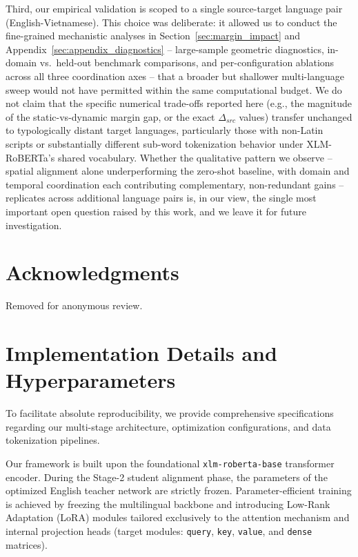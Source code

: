 \documentclass[11pt]{article}
\begin{document}
Third, our empirical validation is scoped to a single source-target language pair (English-Vietnamese). This choice was deliberate: it allowed us to conduct the fine-grained mechanistic analyses in Section~\ref{sec:margin_impact} and Appendix~\ref{sec:appendix_diagnostics} -- large-sample geometric diagnostics, in-domain vs.\ held-out benchmark comparisons, and per-configuration ablations across all three coordination axes -- that a broader but shallower multi-language sweep would not have permitted within the same computational budget. We do not claim that the specific numerical trade-offs reported here (e.g., the magnitude of the static-vs-dynamic margin gap, or the exact $\Delta_{src}$ values) transfer unchanged to typologically distant target languages, particularly those with non-Latin scripts or substantially different sub-word tokenization behavior under XLM-RoBERTa's shared vocabulary. Whether the qualitative pattern we observe -- spatial alignment alone underperforming the zero-shot baseline, with domain and temporal coordination each contributing complementary, non-redundant gains -- replicates across additional language pairs is, in our view, the single most important open question raised by this work, and we leave it for future investigation.

\section*{Acknowledgments}
Removed for anonymous review.

%



\appendix

\section{Implementation Details and Hyperparameters}
\label{sec:appendix_implementation}
To facilitate absolute reproducibility, we provide comprehensive specifications regarding our multi-stage architecture, optimization configurations, and data tokenization pipelines. 

Our framework is built upon the foundational \texttt{xlm-roberta-base} transformer encoder. During the Stage-2 student alignment phase, the parameters of the optimized English teacher network are strictly frozen. Parameter-efficient training is achieved by freezing the multilingual backbone and introducing Low-Rank Adaptation (LoRA) modules tailored exclusively to the attention mechanism and internal projection heads (target modules: \texttt{query}, \texttt{key}, \texttt{value}, and \texttt{dense} matrices). 
\end{document}
